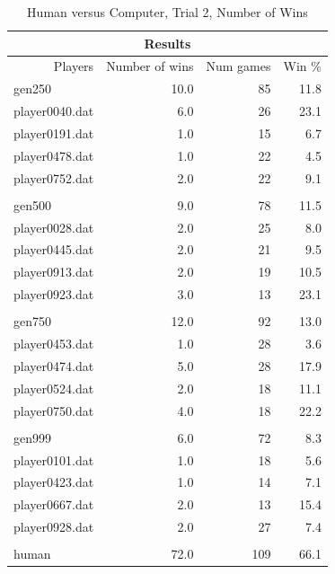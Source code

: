 \begin{table}[htbp]
  \centering
  \caption{Human versus Computer, Trial 2, Number of Wins}
    \begin{tabular}{rrrr}
    \toprule
    \multicolumn{4}{c}{Results} \\
    \midrule
    Players & Number of wins & Num games & Win \% \\
    \midrule
    \multicolumn{1}{l}{gen250}         & 10.0 & 85 & 11.8 \\
    \multicolumn{1}{l}{player0040.dat} & 6.0  & 26 & 23.1 \\
    \multicolumn{1}{l}{player0191.dat} & 1.0  & 15 & 6.7 \\
    \multicolumn{1}{l}{player0478.dat} & 1.0  & 22 & 4.5 \\
    \multicolumn{1}{l}{player0752.dat} & 2.0  & 22 & 9.1 \\ \\
    \multicolumn{1}{l}{gen500}         & 9.0  & 78  & 11.5  \\
    \multicolumn{1}{l}{player0028.dat} & 2.0  & 25  & 8.0  \\
    \multicolumn{1}{l}{player0445.dat} & 2.0  & 21  & 9.5  \\
    \multicolumn{1}{l}{player0913.dat} & 2.0  & 19  & 10.5  \\
    \multicolumn{1}{l}{player0923.dat} & 3.0  & 13  & 23.1  \\ \\
    \multicolumn{1}{l}{gen750}         & 12.0 & 92  & 13.0  \\
    \multicolumn{1}{l}{player0453.dat} & 1.0  & 28  & 3.6  \\
    \multicolumn{1}{l}{player0474.dat} & 5.0  & 28  & 17.9  \\
    \multicolumn{1}{l}{player0524.dat} & 2.0  & 18  & 11.1  \\
    \multicolumn{1}{l}{player0750.dat} & 4.0  & 18  & 22.2  \\ \\
    \multicolumn{1}{l}{gen999}         & 6.0  & 72  & 8.3  \\
    \multicolumn{1}{l}{player0101.dat} & 1.0  & 18  & 5.6  \\
    \multicolumn{1}{l}{player0423.dat} & 1.0  & 14  & 7.1  \\
    \multicolumn{1}{l}{player0667.dat} & 2.0  & 13  & 15.4  \\
    \multicolumn{1}{l}{player0928.dat} & 2.0  & 27  & 7.4  \\ \\
    \multicolumn{1}{l}{human}          & 72.0 & 109 & 66.1  \\
    \bottomrule
    \end{tabular}%
  \label{tab:human_rga_2a}%
\end{table}%

